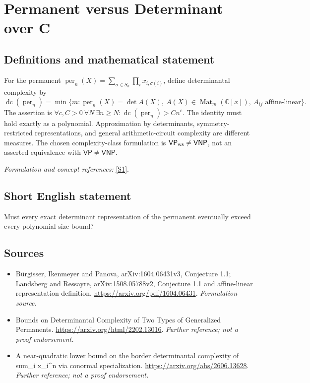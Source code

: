 \documentclass[11pt]{article}
\begin{document}
\section*{\texorpdfstring{Permanent versus Determinant over C}{Permanent versus Determinant over C}}\label{statement}
\subsection{Definitions and mathematical statement}
For the permanent $\operatorname{per}_n(X)=\sum_{\sigma\in S_n}\prod_i x_{i,\sigma(i)}$, define determinantal complexity by
\[
 \operatorname{dc}(\operatorname{per}_n)=\min\{m:\operatorname{per}_n(X)=\det A(X),\
 A(X)\in\operatorname{Mat}_m({\mathbb{C}}[x]),\ A_{ij}\text{ affine-linear}\}.
\]
The assertion is $\forall c,C>0\ \forall N\ \exists n\ge N:\operatorname{dc}(\operatorname{per}_n)>Cn^c$. The identity must hold exactly as a polynomial. Approximation by determinants, symmetry-restricted representations, and general arithmetic-circuit complexity are different measures. The chosen complexity-class formulation is $\mathsf{VP}_{\rm ws}\ne\mathsf{VNP}$, not an asserted equivalence with $\mathsf{VP}\ne\mathsf{VNP}$.
\par\smallskip\textit{Formulation and concept references:} \href{https://arxiv.org/pdf/1604.06431}{[S1]}.

\subsection{Short English statement}
Must every exact determinant representation of the permanent eventually exceed every polynomial size bound?
\subsection{Sources}
\begin{itemize}
\item[S1]Bürgisser, Ikenmeyer and Panova, arXiv:1604.06431v3, Conjecture 1.1; Landsberg and Ressayre, arXiv:1508.05788v2, Conjecture 1.1 and affine-linear representation definition.
\url{https://arxiv.org/pdf/1604.06431}.
\textit{Formulation source.}
\item[S2]Bounds on Determinantal Complexity of Two Types of Generalized Permanents.
\url{https://arxiv.org/html/2202.13016}.
\textit{Further reference; not a proof endorsement.}
\item[S3]A near-quadratic lower bound on the border determinantal complexity of sum\_i x\_i\textasciicircum{}n via conormal specialization.
\url{https://arxiv.org/abs/2606.13628}.
\textit{Further reference; not a proof endorsement.}
\end{itemize}
\end{document}

